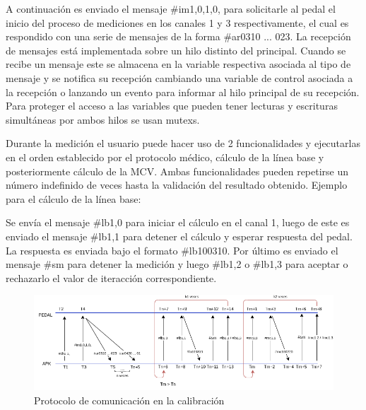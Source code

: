A continuación es enviado el mensaje \#im1,0,1,0, para solicitarle al pedal el inicio del proceso de mediciones en los canales 1 y 3  respectivamente, el cual es respondido con una serie de mensajes de la forma \#ar0310 ... 023. La recepción de mensajes está implementada sobre un hilo distinto del principal. Cuando se recibe un mensaje este se almacena en la variable respectiva asociada al tipo de mensaje y se notifica su recepción cambiando una variable de control asociada a la recepción o lanzando un evento para informar al hilo principal de su recepción. Para proteger el acceso a las variables que pueden tener lecturas y escrituras simultáneas por ambos hilos se usan mutexs.

Durante la medición el usuario puede hacer uso de 2 funcionalidades y ejecutarlas en el orden establecido por el protocolo médico, cálculo de la línea base y posteriormente cálculo de la MCV. Ambas funcionalidades pueden repetirse un número indefinido de veces hasta la validación del resultado obtenido. Ejemplo para el cálculo de la línea base:
    
Se envía el mensaje \#lb1,0 para iniciar el cálculo en el canal 1, luego de este es enviado el mensaje  \#lb1,1 para detener el cálculo y esperar respuesta del pedal. La respuesta es enviada bajo el formato  \#lb100310. Por último es enviado el mensaje \#sm para detener la medición y luego \#lb1,2 o \#lb1,3 para aceptar o rechazarlo el valor de iteracción correspondiente.  

\begin{figure}[ht]
    \centering
    \includegraphics[scale=0.58]{images/diagram-protocol-in-calibration.png}
    \caption{Protocolo de comunicación en la calibración}
    \label{fig: diagram-protocol-in-calibration}
\end{figure}
